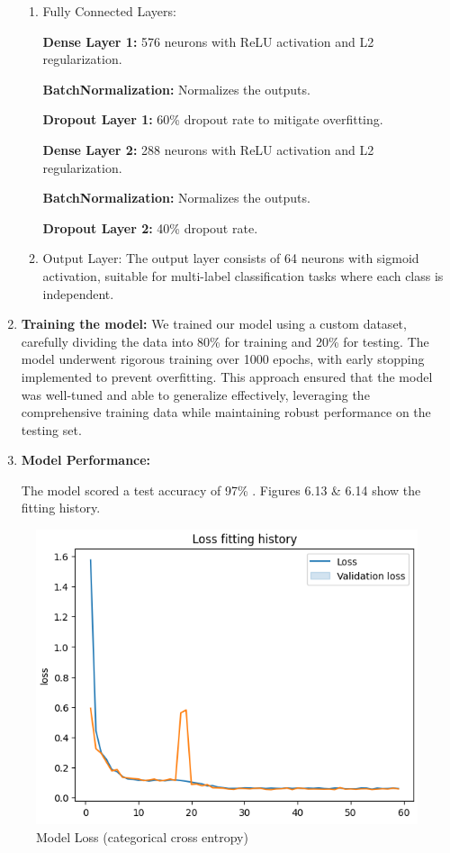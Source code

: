 \begin{enumerate}
\begin{enumerate}
        \item Fully Connected Layers:

        \textbf{Dense Layer 1:} 576 neurons with ReLU activation and L2 regularization.
        
        \textbf{BatchNormalization:} Normalizes the outputs.
        
        \textbf{Dropout Layer 1:} 60\% dropout rate to mitigate overfitting.
        
        \textbf{Dense Layer 2:} 288 neurons with ReLU activation and L2 regularization.
        
        \textbf{BatchNormalization:} Normalizes the outputs.
        
        \textbf{Dropout Layer 2:} 40\% dropout rate.
        
        \item Output Layer: The output layer consists of 64 neurons with sigmoid activation, suitable for multi-label classification tasks where each class is independent.
        
    \end{enumerate}

      \item \textbf{Training the model:}
  We trained our model using a custom dataset, carefully dividing the data into 80\% for training and 20\% for testing. The model underwent rigorous training over 1000 epochs, with early stopping implemented to prevent overfitting. This approach ensured that the model was well-tuned and able to generalize effectively, leveraging the comprehensive training data while maintaining robust performance on the testing set.

   \item \textbf{Model Performance:}

   The model scored a test accuracy of 97\% . Figures 6.13 \& 6.14 show the fitting history.
        

\end{enumerate}

   \begin{figure}[H]
        \centering
        \includegraphics[]{cnn_loss_history.png}
        \caption{Model Loss (categorical cross entropy)}
        \end{figure}

